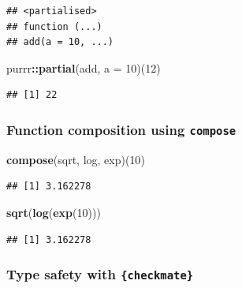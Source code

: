 \documentclass[]{gitbook}
\newenvironment{Shaded}{\begin{snugshade}}{\end{snugshade}}
\newcommand{\DataTypeTok}[1]{\textcolor[rgb]{0.13,0.29,0.53}{#1}}
\newcommand{\DecValTok}[1]{\textcolor[rgb]{0.00,0.00,0.81}{#1}}
\newcommand{\KeywordTok}[1]{\textcolor[rgb]{0.13,0.29,0.53}{\textbf{#1}}}
\newcommand{\NormalTok}[1]{#1}
\newcommand{\OperatorTok}[1]{\textcolor[rgb]{0.81,0.36,0.00}{\textbf{#1}}}
\begin{document}
\begin{verbatim}
## <partialised>
## function (...) 
## add(a = 10, ...)
\end{verbatim}

\begin{Shaded}
\begin{Highlighting}[]
\NormalTok{purrr}\OperatorTok{::}\KeywordTok{partial}\NormalTok{(add, }\DataTypeTok{a =} \DecValTok{10}\NormalTok{)(}\DecValTok{12}\NormalTok{)}
\end{Highlighting}
\end{Shaded}

\begin{verbatim}
## [1] 22
\end{verbatim}

\hypertarget{function-composition-using-compose}{%
\subsubsection{\texorpdfstring{Function composition using \texttt{compose}}{Function composition using compose}}\label{function-composition-using-compose}}

\begin{Shaded}
\begin{Highlighting}[]
\KeywordTok{compose}\NormalTok{(sqrt, log, exp)(}\DecValTok{10}\NormalTok{)}
\end{Highlighting}
\end{Shaded}

\begin{verbatim}
## [1] 3.162278
\end{verbatim}

\begin{Shaded}
\begin{Highlighting}[]
\KeywordTok{sqrt}\NormalTok{(}\KeywordTok{log}\NormalTok{(}\KeywordTok{exp}\NormalTok{(}\DecValTok{10}\NormalTok{)))}
\end{Highlighting}
\end{Shaded}

\begin{verbatim}
## [1] 3.162278
\end{verbatim}

\hypertarget{type-safety-with-checkmate}{%
\subsubsection{\texorpdfstring{Type safety with \texttt{\{checkmate\}}}{Type safety with \{checkmate\}}}\label{type-safety-with-checkmate}}
\end{document}
